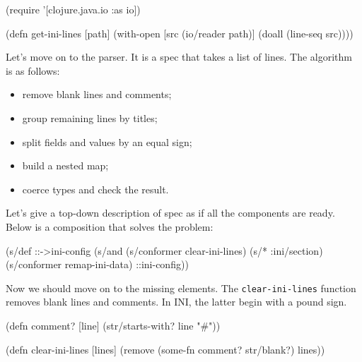 

\begin{english}
  \begin{clojure}
(require '[clojure.java.io :as io])

(defn get-ini-lines [path]
  (with-open [src (io/reader path)]
    (doall (line-seq src))))
  \end{clojure}
\end{english}

Let's move on to the parser. It is a spec that takes a list of lines. The algorithm is as follows:

\begin{itemize}

\item
  remove blank lines and comments;

\item
  group remaining lines by titles;

\item
  split fields and values by an equal sign;

\item
  build a nested map;

\item
  coerce types and check the result.

\end{itemize}

Let's give a top-down description of spec as if all the components are ready. Below is a composition that solves the problem:

\begin{english}
  \begin{clojure}
(s/def ::->ini-config
  (s/and
   (s/conformer clear-ini-lines)
   (s/* :ini/section)
   (s/conformer remap-ini-data)
   ::ini-config))
  \end{clojure}
\end{english}


Now we should move on to the missing elements. The \verb|clear-ini-lines| function removes blank lines and comments. In INI, the latter begin with a pound sign.

\ifx\DEVICETYPE\MOBILE

\begin{english}
  \begin{clojure}
(defn comment? [line]
  (str/starts-with? line "#"))

(defn clear-ini-lines [lines]
  (remove
    (some-fn comment? str/blank?) lines))
  \end{clojure}
\end{english}

